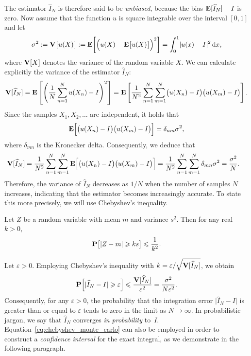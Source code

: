 The estimator $\widehat I_N$ is therefore said to be \emph{unbiased},
because the bias $\mathbf E [\widehat I_N] - I$ is zero.
Now assume that the function $u$ is square integrable over the interval $[0, 1]$ and let
\[
    \sigma^2 := \mathbf V\bigl[u(X)\bigr] := \mathbf E \biggl[ \Bigl(u(X) - \mathbf E \bigl[u(X)\bigr]\Bigr)^2 \biggr]  = \int_{0}^{1} \lvert u(x) - I \rvert^2 \, \mathrm d x,
\]
where $\mathbf V[X]$ denotes the variance of the random variable $X$.
We can calculate explicitly the variance of the estimator $\widehat I_N$:
\begin{align*}
    \mathbf V[\widehat I_N]
    = \mathbf E \left[ \left( \frac{1}{N} \sum_{n=1}^{N} u(X_n) - I \right)^2 \right]
    = \mathbf E \left[ \frac{1}{N^2} \sum_{n=1}^{N} \sum_{m=1}^{N} \bigl(u(X_n) - I\bigr) \bigl(u(X_m) - I\bigr) \right].
\end{align*}
Since the samples $X_1, X_2, \dotsc$ are independent,
it holds that
\[
    \mathbf E\Bigl[\bigl(u(X_n) - I\bigr) \bigl(u(X_m) - I\bigr)\Bigr] = \delta_{nm} \sigma^2,
\]
where $\delta_{mn}$ is the Kronecker delta.
Consequently, we deduce that
\begin{align*}
    \mathbf V[\widehat I_N]
    &=  \frac{1}{N^2} \sum_{n=1}^{N} \sum_{m=1}^{N} \mathbf E \Bigl[ \bigl(u(X_n) - I\bigr) \bigl(u(X_m) - I\bigr) \Bigr]
    =  \frac{1}{N^2} \sum_{n=1}^{N} \sum_{m=1}^{N} \delta_{mn} \sigma^2 = \frac{\sigma^2}{N}.
\end{align*}
Therefore, the variance of $\widehat I_N$ decreases as $1/N$ when the number of samples $N$ increases,
indicating that the estimator becomes increasingly accurate.
To state this more precisely,
we will use Chebyshev's inequality.
\begin{theorem}
    Let $Z$ be a random variable with mean $m$ and variance $s^2$.
    Then for any real $k > 0$,
    \[
        \mathbf P \bigl[ |Z - m|  \geqslant k s \bigr] \leqslant \frac{1}{k^2}.
    \]
\end{theorem}
Let $\varepsilon > 0$.
Employing Chebyshev's inequality with $k = \varepsilon / \sqrt{\mathbf V[\widehat I_N]}$,
we obtain
\begin{equation}
    \label{eq:chebyshev_monte_carlo}
    \mathbf P\Bigl[\lvert \widehat I_N - I \rvert \geqslant \varepsilon \Bigr]
    \leqslant \frac{\mathbf V[\widehat I_N]}{\varepsilon^2}
    = \frac{\sigma^2}{N \varepsilon^2}.
\end{equation}
Consequently, for any $\varepsilon > 0$,
the probability that the integration error $\bigl\lvert \widehat I_N - I \bigr\rvert$ is greater than or equal to $\varepsilon$ tends to zero in the limit as $N \to \infty$.
In probabilistic jargon, we say that $\widehat I_N$ converges \emph{in probability} to~$I$.
Equation~\eqref{eq:chebyshev_monte_carlo} can also be employed in order to construct a \emph{confidence interval} for the exact integral,
as we demonstrate in the following paragraph.

